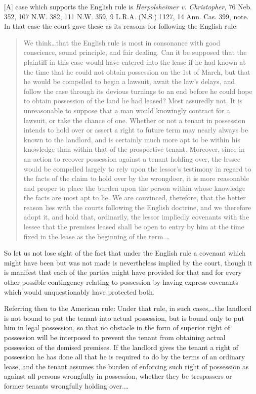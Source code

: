[A] case which supports the English rule is \textit{Herpolsheimer v.
Christopher}, 76 Neb. 352, 107 N.W. 382, 111 N.W. 359, 9 L.R.A. (N.S.) 1127, 14
Ann. Cas. 399, note. In that case the court gave these as its reasons for
following the English rule: 
\begin{quote}
We think\ldots that the English rule is most in consonance with good conscience,
sound principle, and fair dealing. Can it be supposed that the plaintiff in
this case would have entered into the lease if he had known at the time that he
could not obtain possession on the 1st of March, but that he would be compelled
to begin a lawsuit, await the law's delays, and follow the case through its
devious turnings to an end before he could hope to obtain possession of the
land he had leased? Most assuredly not. It is unreasonable to suppose that a
man would knowingly contract for a lawsuit, or take the chance of one. Whether
or not a tenant in possession intends to hold over or assert a right to future
term may nearly always be known to the landlord, and is certainly much more apt
to be within his knowledge than within that of the prospective tenant.
Moreover, since in an action to recover possession against a tenant holding
over, the lessee would be compelled largely to rely upon the lessor's testimony
in regard to the facts of the claim to hold over by the wrongdoer, it is more
reasonable and proper to place the burden upon the person within whose
knowledge the facts are most apt to lie. We are convinced, therefore, that the
better reason lies with the courts following the English doctrine, and we
therefore adopt it, and hold that, ordinarily, the lessor impliedly covenants
with the lessee that the premises leased shall be open to entry by him at the
time fixed in the lease as the beginning of the term.\ldots
\end{quote}
So let us not lose sight of the fact that under the English rule a covenant
which might have been but was not made is nevertheless implied by the court,
though it is manifest that each of the parties might have provided for that and
for every other possible contingency relating to possession by having express
covenants which would unquestionably have protected both.

Referring then to the American rule: Under that rule, in such cases,\ldots the
landlord is not bound to put the tenant into actual possession, but is bound
only to put him in legal possession, so that no obstacle in the form of
superior right of possession will be interposed to prevent the tenant from
obtaining actual possession of the demised premises. If the landlord gives the
tenant a right of possession he has done all that he is required to do by the
terms of an ordinary lease, and the tenant assumes the burden of enforcing such
right of possession as against all persons wrongfully in possession, whether
they be trespassers or former tenants wrongfully holding over.\ldots

